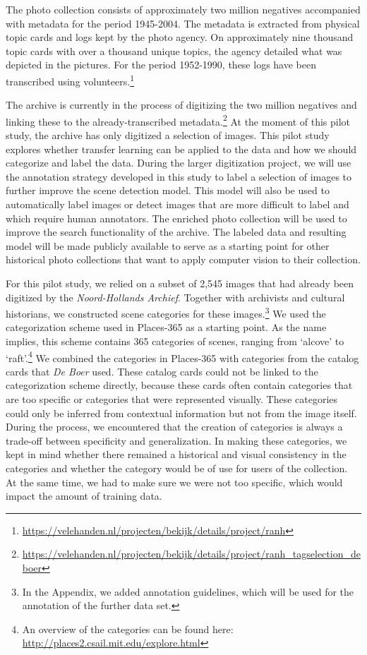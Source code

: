 \documentclass[a4paper,twoside]{article}
\begin{document}
The photo collection consists of approximately two million negatives accompanied with metadata for the period 1945-2004.
The metadata is extracted from physical topic cards and logs kept by the photo agency.
On approximately nine thousand topic cards with over a thousand unique topics, the agency detailed what was depicted in the pictures. 
For the period 1952-1990, these logs have been transcribed using volunteers.\footnote{\url{https://velehanden.nl/projecten/bekijk/details/project/ranh}}

The archive is currently in the process of digitizing the two million negatives and linking these to the already-transcribed metadata.\footnote{\url{https://velehanden.nl/projecten/bekijk/details/project/ranh_tagselection_deboer}}
At the moment of this pilot study, the archive has only digitized a selection of images. 
This pilot study explores whether transfer learning can be applied to the data and how we should categorize and label the data. 
During the larger digitization project, we will use the annotation strategy developed in this study to label a selection of images to further improve the scene detection model. 
This model will also be used to automatically label images or detect images that are more difficult to label and which require human annotators.
The enriched photo collection will be used to improve the search functionality of the archive. 
The labeled data and resulting model will be made publicly available to serve as a starting point for other historical photo collections that want to apply computer vision to their collection.

For this pilot study, we relied on a subset of 2,545 images that had already been digitized by the \emph{Noord-Hollands Archief}. 
Together with archivists and cultural historians, we constructed scene categories for these images.\footnote{In the Appendix, we added annotation guidelines, which will be used for the annotation of the further data set.} 
We used the categorization scheme used in Places-365 as a starting point. 
As the name implies, this scheme contains 365 categories of scenes, ranging from `alcove' to `raft'.\footnote{An overview of the categories can be found here: \url{http://places2.csail.mit.edu/explore.html}} 
We combined the categories in Places-365 with categories from the catalog cards that \textit{De
  Boer} used. 
These catalog cards could not be linked to the categorization scheme directly, because these cards often contain categories that are too specific or categories that were represented visually. 
These categories could only be inferred from contextual information but not from the image itself. 
During the process, we encountered that the creation of categories is always a trade-off between specificity and generalization. 
In making these categories, we kept in mind whether there remained a historical and visual consistency in the categories and whether the category would be of use for users of the collection. 
At the same time, we had to make sure we were not too specific, which would impact the amount of training data. 
\end{document}
